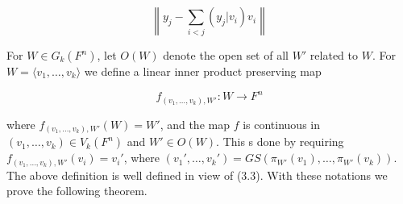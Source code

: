 $$\left\| y_j - \sum_{i < j} (y_j|v_i)v_i \right\|$$

For $W \in G_k(F^n)$, let $O(W)$ denote the open set of all $W'$ related to $W$. For $W = \langle v_1, \ldots, v_k \rangle$ we define a linear inner product preserving map

$$f_{(v_1, \ldots, v_k), W'} : W \rightarrow F^n$$

where $f_{(v_1, \ldots, v_k), W'} (W) = W'$, and the map $f$ is continuous in $(v_1, \ldots, v_k) \in V_k(F^n)$ and $W' \in O(W)$. This s done by requiring $f_{(v_1, \ldots, v_k), W'} (v_i) = v_i'$, where $(v_1', \ldots, v_k') = GS(\pi_{W'} (v_1), \ldots, \pi_{W'} (v_k))$. The above definition is well defined in view of (3.3). With these notations we prove the following theorem.
